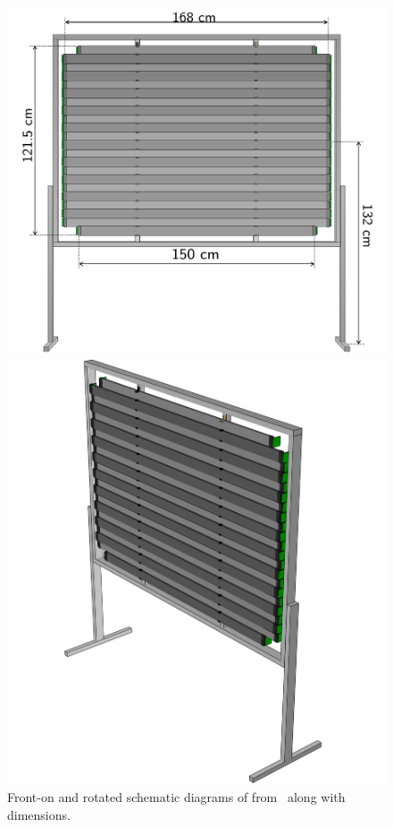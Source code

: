 \begin{figure}[h]
  \begin{minipage}[t]{.55\linewidth}
    \includegraphics[width=\linewidth]{files/figures/hptpc_beam_flux/uToF_sketch}
  \end{minipage}
  \hfill
  \begin{minipage}[t]{.41\linewidth}
    \includegraphics[width=\linewidth]{files/figures/hptpc_beam_flux/uTOF_rot}
  \end{minipage}
  \caption[Schematic diagrams of \SThree.]{Front-on and rotated schematic diagrams of \SThree from~\cite{s3Paper} along with dimensions.}
  \label{fig:s3Diag}
\end{figure}

